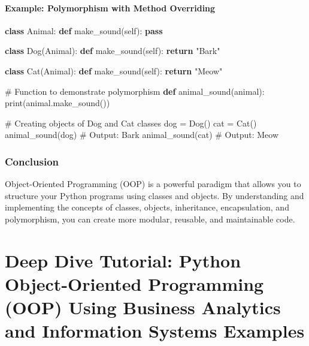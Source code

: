\documentclass[
  letterpaper,
  DIV=11,
  numbers=noendperiod]{scrreprt}
\newenvironment{Shaded}{\begin{snugshade}}{\end{snugshade}}
\newcommand{\BuiltInTok}[1]{\textcolor[rgb]{0.00,0.23,0.31}{#1}}
\newcommand{\CommentTok}[1]{\textcolor[rgb]{0.37,0.37,0.37}{#1}}
\newcommand{\ControlFlowTok}[1]{\textcolor[rgb]{0.00,0.23,0.31}{\textbf{#1}}}
\newcommand{\KeywordTok}[1]{\textcolor[rgb]{0.00,0.23,0.31}{\textbf{#1}}}
\newcommand{\NormalTok}[1]{\textcolor[rgb]{0.00,0.23,0.31}{#1}}
\newcommand{\OperatorTok}[1]{\textcolor[rgb]{0.37,0.37,0.37}{#1}}
\newcommand{\StringTok}[1]{\textcolor[rgb]{0.13,0.47,0.30}{#1}}
\newcommand{\VariableTok}[1]{\textcolor[rgb]{0.07,0.07,0.07}{#1}}
\begin{document}
\subsubsection{Example: Polymorphism with Method
Overriding}\label{example-polymorphism-with-method-overriding}

\begin{Shaded}
\begin{Highlighting}[]
\KeywordTok{class}\NormalTok{ Animal:}
    \KeywordTok{def}\NormalTok{ make\_sound(}\VariableTok{self}\NormalTok{):}
        \ControlFlowTok{pass}

\KeywordTok{class}\NormalTok{ Dog(Animal):}
    \KeywordTok{def}\NormalTok{ make\_sound(}\VariableTok{self}\NormalTok{):}
        \ControlFlowTok{return} \StringTok{"Bark"}

\KeywordTok{class}\NormalTok{ Cat(Animal):}
    \KeywordTok{def}\NormalTok{ make\_sound(}\VariableTok{self}\NormalTok{):}
        \ControlFlowTok{return} \StringTok{"Meow"}

\CommentTok{\# Function to demonstrate polymorphism}
\KeywordTok{def}\NormalTok{ animal\_sound(animal):}
    \BuiltInTok{print}\NormalTok{(animal.make\_sound())}

\CommentTok{\# Creating objects of Dog and Cat classes}
\NormalTok{dog }\OperatorTok{=}\NormalTok{ Dog()}
\NormalTok{cat }\OperatorTok{=}\NormalTok{ Cat()}
\NormalTok{animal\_sound(dog)  }\CommentTok{\# Output: Bark}
\NormalTok{animal\_sound(cat)  }\CommentTok{\# Output: Meow}
\end{Highlighting}
\end{Shaded}

\subsection{Conclusion}\label{conclusion-13}

Object-Oriented Programming (OOP) is a powerful paradigm that allows you
to structure your Python programs using classes and objects. By
understanding and implementing the concepts of classes, objects,
inheritance, encapsulation, and polymorphism, you can create more
modular, reusable, and maintainable code.


\chapter{Deep Dive Tutorial: Python Object-Oriented Programming (OOP)
Using Business Analytics and Information Systems
Examples}\label{deep-dive-tutorial-python-object-oriented-programming-oop-using-business-analytics-and-information-systems-examples}
\end{document}

